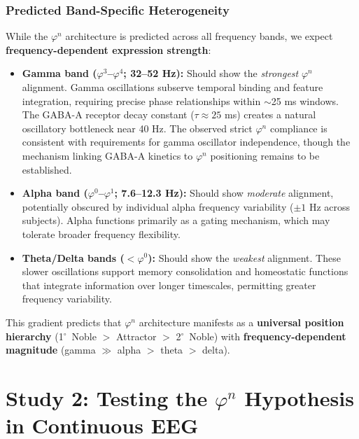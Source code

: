 \documentclass[11pt,a4paper]{article}
\newcommand{\degree}{$^\circ$}  %
\newcommand{\phisym}{\varphi}
\begin{document}
\subsubsection{Predicted Band-Specific Heterogeneity}

While the $\phisym^n$ architecture is predicted across all frequency bands, we expect \textbf{frequency-dependent expression strength}:

\begin{itemize}
    \item \textbf{Gamma band ($\phisym^3$--$\phisym^4$; 32--52 Hz):} Should show the \textit{strongest} $\phisym^n$ alignment. Gamma oscillations subserve temporal binding and feature integration, requiring precise phase relationships within $\sim$25 ms windows. The GABA-A receptor decay constant ($\tau \approx 25$ ms) creates a natural oscillatory bottleneck near 40 Hz. The observed strict $\phisym^n$ compliance is consistent with requirements for gamma oscillator independence, though the mechanism linking GABA-A kinetics to $\phisym^n$ positioning remains to be established.

    \item \textbf{Alpha band ($\phisym^0$--$\phisym^1$; 7.6--12.3 Hz):} Should show \textit{moderate} alignment, potentially obscured by individual alpha frequency variability ($\pm 1$ Hz across subjects). Alpha functions primarily as a gating mechanism, which may tolerate broader frequency flexibility.

    \item \textbf{Theta/Delta bands ($<\phisym^0$):} Should show the \textit{weakest} alignment. These slower oscillations support memory consolidation and homeostatic functions that integrate information over longer timescales, permitting greater frequency variability.
\end{itemize}

This gradient predicts that $\phisym^n$ architecture manifests as a \textbf{universal position hierarchy} (1\degree\ Noble $>$ Attractor $>$ 2\degree\ Noble) with \textbf{frequency-dependent magnitude} (gamma $\gg$ alpha $>$ theta $>$ delta).

\section{Study 2: Testing the $\phisym^n$ Hypothesis in Continuous EEG}
\end{document}

